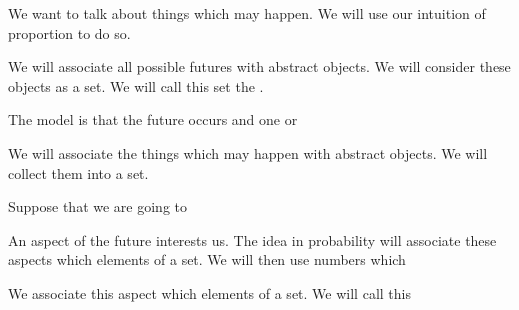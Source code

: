 

We want to talk about
things which may happen.
We will use our intuition
of proportion to do so.


We will associate all possible
futures with abstract objects.
We will consider these
objects as a set.
We will call this set
the .

The model is that the future
occurs and one or

We will associate the
things which may happen
with abstract objects.
We will collect them
into a set.

Suppose that we are going to

An aspect of the future
interests us. The idea
in probability will associate
these aspects which elements
of a set.
We will then use numbers which

We associate
this aspect which elements
of a set.
We will call this
